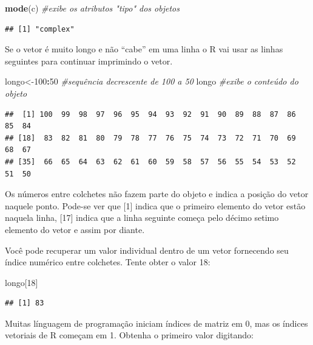 \documentclass[]{book}
\newenvironment{Shaded}{\begin{snugshade}}{\end{snugshade}}
\newcommand{\CommentTok}[1]{\textcolor[rgb]{0.56,0.35,0.01}{\textit{#1}}}
\newcommand{\DecValTok}[1]{\textcolor[rgb]{0.00,0.00,0.81}{#1}}
\newcommand{\KeywordTok}[1]{\textcolor[rgb]{0.13,0.29,0.53}{\textbf{#1}}}
\newcommand{\NormalTok}[1]{#1}
\newcommand{\OperatorTok}[1]{\textcolor[rgb]{0.81,0.36,0.00}{\textbf{#1}}}
\begin{document}
\begin{Shaded}
\begin{Highlighting}[]
\KeywordTok{mode}\NormalTok{(c) }\CommentTok{#exibe os atributos "tipo" dos objetos }
\end{Highlighting}
\end{Shaded}

\begin{verbatim}
## [1] "complex"
\end{verbatim}

Se o vetor é muito longo e não ``cabe'' em uma linha o R vai usar as linhas seguintes para continuar imprimindo o vetor.

\begin{Shaded}
\begin{Highlighting}[]
\NormalTok{longo<-}\DecValTok{100}\OperatorTok{:}\DecValTok{50} \CommentTok{#sequência decrescente de 100 a 50}
\NormalTok{longo }\CommentTok{#exibe o conteúdo do objeto }
\end{Highlighting}
\end{Shaded}

\begin{verbatim}
##  [1] 100  99  98  97  96  95  94  93  92  91  90  89  88  87  86  85  84
## [18]  83  82  81  80  79  78  77  76  75  74  73  72  71  70  69  68  67
## [35]  66  65  64  63  62  61  60  59  58  57  56  55  54  53  52  51  50
\end{verbatim}

Os números entre colchetes não fazem parte do objeto e indica a posição do vetor naquele ponto. Pode-se ver que {[}1{]} indica que o primeiro elemento do vetor estão naquela linha, {[}17{]} indica que a linha seguinte começa pelo décimo setimo elemento do vetor e
assim por diante.

Você pode recuperar um valor individual dentro de um vetor fornecendo seu índice numérico entre colchetes. Tente obter o valor 18:

\begin{Shaded}
\begin{Highlighting}[]
\NormalTok{longo[}\DecValTok{18}\NormalTok{]}
\end{Highlighting}
\end{Shaded}

\begin{verbatim}
## [1] 83
\end{verbatim}

Muitas línguagem de programação iniciam índices de matriz em 0, mas os índices vetoriais de R começam em 1. Obtenha o primeiro valor digitando:
\end{document}
